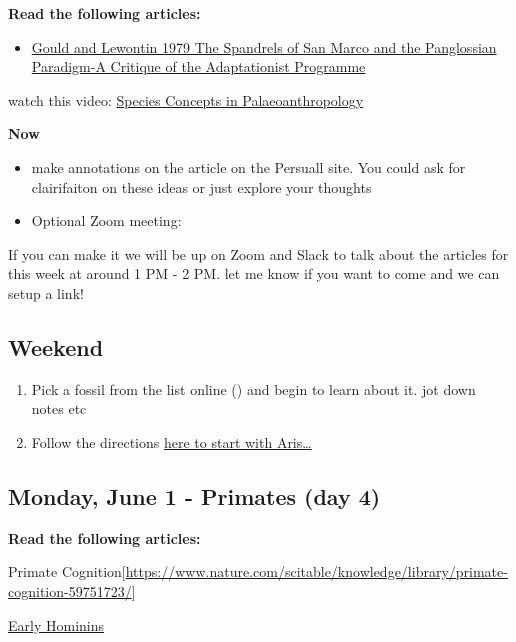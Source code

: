 \documentclass[]{tufte-handout}
\providecommand{\tightlist}{%
  \setlength{\itemsep}{0pt}\setlength{\parskip}{0pt}}
\begin{document}
\textbf{Read the following articles:}

\begin{itemize}
\tightlist
\item
  \href{https://royalsocietypublishing.org/doi/pdf/10.1098/rspb.1979.0086}{Gould
  and Lewontin 1979 The Spandrels of San Marco and the Panglossian
  Paradigm-A Critique of the Adaptationist Programme}
\end{itemize}

watch this video:
\href{https://www.youtube.com/watch?v=GWmtak1BGxo}{Species Concepts in
Palaeoanthropology}

\textbf{Now}

\begin{itemize}
\item
  make annotations on the article on the Persuall site. You could ask
  for clairifaiton on these ideas or just explore your thoughts
\item
  Optional Zoom meeting:
\end{itemize}

If you can make it we will be up on Zoom and Slack to talk about the
articles for this week at around 1 PM - 2 PM. let me know if you want to
come and we can setup a link!

\hypertarget{weekend}{%
\subsection{Weekend}\label{weekend}}

\begin{enumerate}
\def\labelenumi{\arabic{enumi}.}
\tightlist
\item
  Pick a fossil from the list online () and begin to learn about it. jot
  down notes etc
\item
  Follow the directions \href{need}{here to start with Aris\ldots{}}
\end{enumerate}

\hypertarget{monday-june-1---primates-day-4}{%
\subsection{Monday, June 1 - Primates (day
4)}\label{monday-june-1---primates-day-4}}

\textbf{Read the following articles:}

Primate
Cognition{[}\url{https://www.nature.com/scitable/knowledge/library/primate-cognition-59751723/}{]}

\href{http://explorations.americananthro.org/wp-content/uploads/2020/02/Chapter-9-Early-Hominins3.0.pdf}{Early
Hominins}
\end{document}
